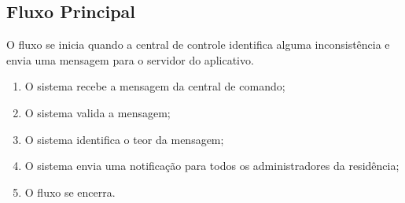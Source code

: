    \subsection{Fluxo Principal}
        O fluxo se inicia quando a central de controle identifica alguma inconsistência e envia uma mensagem para o servidor do aplicativo.
        \begin{enumerate}
            \item O sistema recebe a mensagem da central de comando;
            \item O sistema valida a mensagem;
            \item O sistema identifica o teor da mensagem;
            \item O sistema envia uma notificação para todos os administradores da residência;
            \item O fluxo se encerra.
        \end{enumerate}
